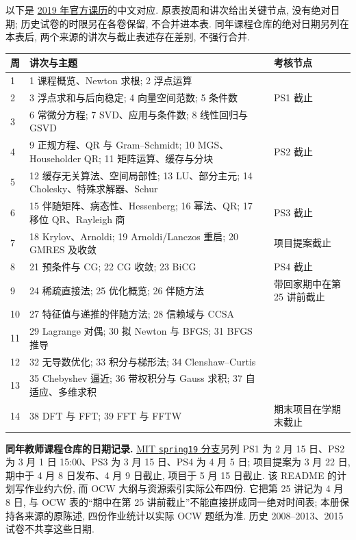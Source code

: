 以下是 \href{https://ocw.mit.edu/courses/18-335j-introduction-to-numerical-methods-spring-2019/pages/calendar/}{2019 年官方课历}的中文对应. 原表按周和讲次给出关键节点, 没有绝对日期; 历史试卷的时限另在各卷保留, 不合并进本表. 同年课程仓库的绝对日期另列在本表后, 两个来源的讲次与截止表述存在差别, 不强行合并.
\begin{longtable}{p{.07\linewidth}p{.62\linewidth}p{.22\linewidth}}
\toprule 周 & 讲次与主题 & 考核节点\\\midrule\endhead
1 & 1 课程概览、Newton 求根; 2 浮点运算 & \\
2 & 3 浮点求和与后向稳定; 4 向量空间范数; 5 条件数 & PS1 截止\\
3 & 6 常微分方程; 7 SVD、应用与条件数; 8 线性回归与 GSVD & \\
4 & 9 正规方程、QR 与 Gram--Schmidt; 10 MGS、Householder QR; 11 矩阵运算、缓存与分块 & PS2 截止\\
5 & 12 缓存无关算法、空间局部性; 13 LU、部分主元; 14 Cholesky、特殊求解器、Schur & \\
6 & 15 伴随矩阵、病态性、Hessenberg; 16 幂法、QR; 17 移位 QR、Rayleigh 商 & PS3 截止\\
7 & 18 Krylov、Arnoldi; 19 Arnoldi/Lanczos 重启; 20 GMRES 及收敛 & 项目提案截止\\
8 & 21 预条件与 CG; 22 CG 收敛; 23 BiCG & PS4 截止\\
9 & 24 稀疏直接法; 25 优化概览; 26 伴随方法 & 带回家期中在第 25 讲前截止\\
10 & 27 特征值与递推的伴随方法; 28 信赖域与 CCSA & \\
11 & 29 Lagrange 对偶; 30 拟 Newton 与 BFGS; 31 BFGS 推导 & \\
12 & 32 无导数优化; 33 积分与梯形法; 34 Clenshaw--Curtis & \\
13 & 35 Chebyshev 逼近; 36 带权积分与 Gauss 求积; 37 自适应、多维求积 & \\
14 & 38 DFT 与 FFT; 39 FFT 与 FFTW & 期末项目在学期末截止\\\bottomrule
\end{longtable}
\textbf{同年教师课程仓库的日期记录.} \href{https://github.com/mitmath/18335/blob/spring19/README.md}{MIT \texttt{spring19} 分支}另列 PS1 为 2 月 15 日、PS2 为 3 月 1 日 15:00、PS3 为 3 月 15 日、PS4 为 4 月 5 日; 项目提案为 3 月 22 日, 期中于 4 月 8 日发布、4 月 9 日截止, 项目于 5 月 15 日截止. 该 README 的计划写作业约六份, 而 OCW 大纲与资源索引实际公布四份. 它把第 25 讲记为 4 月 8 日, 与 OCW 表的“期中在第 25 讲前截止”不能直接拼成同一绝对时间表; 本册保持各来源的原陈述, 四份作业统计以实际 OCW 题纸为准. 历史 2008--2013、2015 试卷不共享这些日期.

